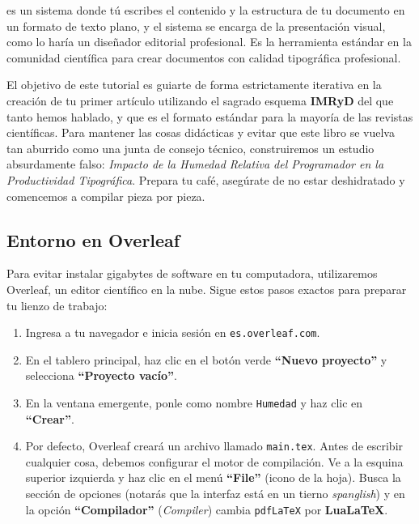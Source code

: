 \begin{remember}
	\label{rem:latex}
	\terminology[LaTeX]{\LaTeX} es un sistema donde tú escribes el contenido y la estructura de tu documento en un formato de texto plano, y el sistema se encarga de la presentación visual, como lo haría un diseñador editorial profesional.
	Es la herramienta estándar en la comunidad científica para crear documentos con calidad tipográfica profesional.
\end{remember}

El objetivo de este tutorial es guiarte de forma estrictamente iterativa en la creación de tu primer artículo utilizando el sagrado esquema \textbf{IMRyD} del que tanto hemos hablado, y que es el formato estándar para la mayoría de las revistas científicas.
Para mantener las cosas didácticas y evitar que este libro se vuelva tan aburrido como una junta de consejo técnico, construiremos un estudio absurdamente falso: \emph{Impacto de la Humedad Relativa del Programador en la Productividad Tipográfica}.
Prepara tu café, asegúrate de no estar deshidratado y comencemos a compilar pieza por pieza.

\subsection*{Entorno en Overleaf}
\label{sub:configuracion_overleaf}

Para evitar instalar gigabytes de software en tu computadora, utilizaremos Overleaf, un editor científico en la nube. Sigue estos pasos exactos para preparar tu lienzo de trabajo:

\begin{enumerate}
	\item Ingresa a tu navegador e inicia sesión en \texttt{es.overleaf.com}.
	\item En el tablero principal, haz clic en el botón verde \textbf{“Nuevo
		      proyecto”} y selecciona \textbf{“Proyecto vacío”}.
	\item En la ventana emergente, ponle como nombre \texttt{Humedad} y haz
	      clic en \textbf{“Crear”}.
	\item Por defecto, Overleaf creará un archivo llamado \texttt{main.tex}.
	      Antes de escribir cualquier cosa, debemos configurar el motor de
	      compilación. Ve a la esquina superior izquierda y haz clic en el menú
	      \textbf{“File”} (icono de la hoja). Busca la sección de opciones
	      (notarás que la interfaz está en un tierno \emph{spanglish}) y en la
	      opción \textbf{“Compilador”} (\emph{Compiler}) cambia \texttt{pdfLaTeX}
	      por \textbf{LuaLaTeX}.
\end{enumerate}

